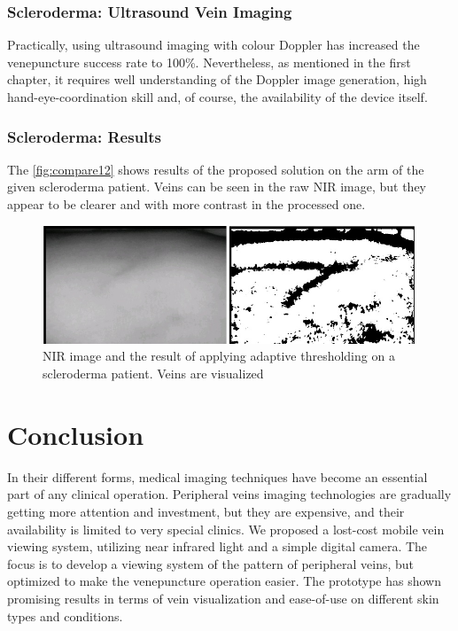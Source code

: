 \subsubsection{Scleroderma: Ultrasound Vein Imaging}
Practically, using ultrasound imaging with colour Doppler has increased the venepuncture success rate to 100\%.
Nevertheless, as mentioned in the first chapter, it requires well understanding of the Doppler image generation, high hand-eye-coordination skill and, of course, the availability of the device itself. 


\subsubsection{Scleroderma: Results}
The \autoref{fig:compare12} shows results of the proposed solution on the arm of the given scleroderma patient. Veins can be seen in the raw NIR image, but they appear to be clearer and with more contrast in the processed one.
\begin{figure}[H]
\centering
\includegraphics[scale=0.8]{figures/compare12.JPG}
\caption[NIR image and the result of applying adaptive thresholding on a scleroderma patient]{NIR image and the result of applying adaptive thresholding on a scleroderma patient. Veins are visualized}\label{fig:compare12}
\end{figure}

\section{Conclusion}

In their different forms, medical imaging techniques have become an essential part of any clinical operation. Peripheral veins imaging technologies are gradually getting more attention and investment, but they are expensive, and their availability is limited to very special clinics. We proposed a lost-cost mobile vein viewing system, utilizing near infrared light and a simple digital camera. The focus is to develop a viewing system of the pattern of peripheral veins, but optimized to make the venepuncture operation easier. The prototype has shown promising results in terms of vein visualization and ease-of-use on different skin types and conditions.

